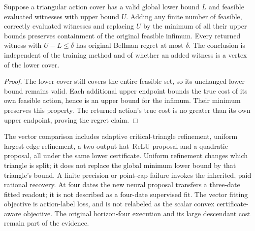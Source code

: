 \begin{proposition}\label{prop:vector-witness69}
Suppose a triangular action cover has a valid global lower bound $L$ and feasible evaluated witnesses with upper bound $U$. Adding any finite number of feasible, correctly evaluated witnesses and replacing $U$ by the minimum of all their upper bounds preserves containment of the original feasible infimum. Every returned witness with $U-L\le\delta$ has original Bellman regret at most $\delta$. The conclusion is independent of the training method and of whether an added witness is a vertex of the lower cover.
\end{proposition}
\begin{proof}
The lower cover still covers the entire feasible set, so its unchanged lower bound remains valid. Each additional upper endpoint bounds the true cost of its own feasible action, hence is an upper bound for the infimum. Their minimum preserves this property. The returned action's true cost is no greater than its own upper endpoint, proving the regret claim.
\end{proof}

The vector comparison includes adaptive critical-triangle refinement, uniform largest-edge refinement, a two-output hat--ReLU proposal and a quadratic proposal, all under the same lower certificate. Uniform refinement changes which triangle is split; it does not replace the global minimum lower bound by that triangle's bound. A finite precision or point-cap failure invokes the inherited, paid rational recovery. At four dates the new neural proposal transfers a three-date fitted readout; it is not described as a four-date supervised fit. The vector fitting objective is action-label loss, and is not relabeled as the scalar convex certificate-aware objective. The original horizon-four execution and its large descendant cost remain part of the evidence.
